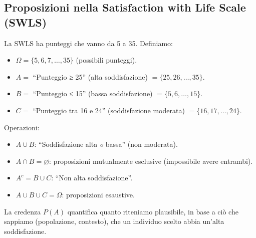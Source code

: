 \documentclass[
  letterpaper,
  DIV=11,
  numbers=noendperiod,
  oneside]{scrreprt}
\providecommand{\tightlist}{%
  \setlength{\itemsep}{0pt}\setlength{\parskip}{0pt}}
\theoremstyle{definition}
\theoremstyle{plain}
\theoremstyle{definition}
\theoremstyle{remark}
\begin{document}
\begin{tcolorbox}[enhanced jigsaw, arc=.35mm, breakable, colbacktitle=quarto-callout-note-color!10!white, opacityback=0, toprule=.15mm, rightrule=.15mm, colback=white, opacitybacktitle=0.6, leftrule=.75mm, coltitle=black, bottomtitle=1mm, left=2mm, toptitle=1mm, title=\textcolor{quarto-callout-note-color}{\faInfo}\hspace{0.5em}{Esempio: Eventi in un test psicometrico}, titlerule=0mm, bottomrule=.15mm, colframe=quarto-callout-note-color-frame]

\subsection{Proposizioni nella Satisfaction with Life Scale
(SWLS)}\label{proposizioni-nella-satisfaction-with-life-scale-swls}

La SWLS ha punteggi che vanno da 5 a 35. Definiamo:

\begin{itemize}
\tightlist
\item
  \(\Omega = \{5, 6, 7, \ldots, 35\}\) (possibili punteggi).
\item
  \(A =\) ``Punteggio ≥ 25'' (alta soddisfazione)
  \(= \{25, 26, \ldots, 35\}\).
\item
  \(B =\) ``Punteggio ≤ 15'' (bassa soddisfazione)
  \(= \{5, 6, \ldots, 15\}\).
\item
  \(C =\) ``Punteggio tra 16 e 24'' (soddisfazione moderata)
  \(= \{16, 17, \ldots, 24\}\).
\end{itemize}

Operazioni:

\begin{itemize}
\tightlist
\item
  \(A \cup B\): ``Soddisfazione alta \emph{o} bassa'' (non moderata).
\item
  \(A \cap B = \varnothing\): proposizioni mutualmente esclusive
  (impossibile avere entrambi).
\item
  \(A^c = B \cup C\): ``Non alta soddisfazione''.
\item
  \(A \cup B \cup C = \Omega\): proposizioni esaustive.
\end{itemize}

La credenza \(P(A)\) quantifica quanto riteniamo plausibile, in base a
ciò che sappiamo (popolazione, contesto), che un individuo scelto abbia
un'alta soddisfazione.

\end{tcolorbox}
\end{document}
